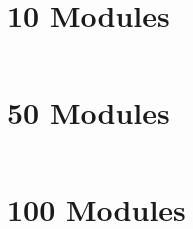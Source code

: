 \section{10 Modules}
\inputminted[fontsize=\footnotesize]{text}{./results/10m10p.txt}

\section{50 Modules}
\inputminted[fontsize=\footnotesize]{text}{./results/50m10p.txt}

\section{100 Modules}
\inputminted[fontsize=\footnotesize]{text}{./results/100m50p.txt}